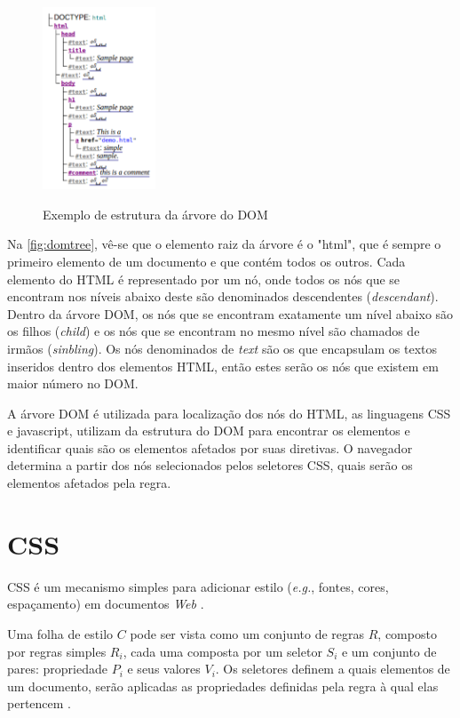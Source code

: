 \begin{figure}[!htb]
	\centering
	\caption{Exemplo de estrutura da árvore do DOM}
	\includegraphics[width=0.3\textwidth]{./04-figuras/DOMsnippet}
	\label{fig:domtree}
\end{figure}

Na \autoref{fig:domtree}, vê-se que o elemento raiz da árvore é o "html", que é sempre o primeiro elemento de um documento e que contém todos os outros. Cada elemento do HTML é representado por um nó, onde todos os nós que se encontram nos níveis abaixo deste são denominados descendentes (\textit{descendant}). Dentro da árvore DOM, os nós que se encontram exatamente um nível abaixo são os filhos (\textit{child}) e os nós que se encontram no mesmo nível são chamados de irmãos (\textit{sinbling}). Os nós denominados de \textit{text} são os que encapsulam os textos inseridos dentro dos elementos HTML, então estes serão os nós que existem em maior número no DOM.

A árvore DOM é utilizada para localização dos nós do HTML, as linguagens  CSS e javascript, utilizam da estrutura do DOM para encontrar os elementos e identificar quais são os elementos afetados por suas diretivas. O navegador determina a partir dos nós selecionados pelos seletores CSS, quais serão os elementos afetados pela regra.

\section{CSS}
\label{sec:CSS}
CSS é um mecanismo simples para adicionar estilo (\textit{e.g.}, fontes, cores, espaçamento) em documentos \textit{Web} \cite{W3Ccss2015}.

Uma folha de estilo \(C\) pode ser vista como um conjunto de regras \(R\), composto por regras simples \(R_i\), cada uma composta por um seletor \(S_i\) e um conjunto de pares: propriedade \(P_i\) e seus valores \(V_i\). Os seletores definem a quais elementos de um documento, serão aplicadas as propriedades definidas pela regra à qual elas pertencem \cite{Geneves2012}.

